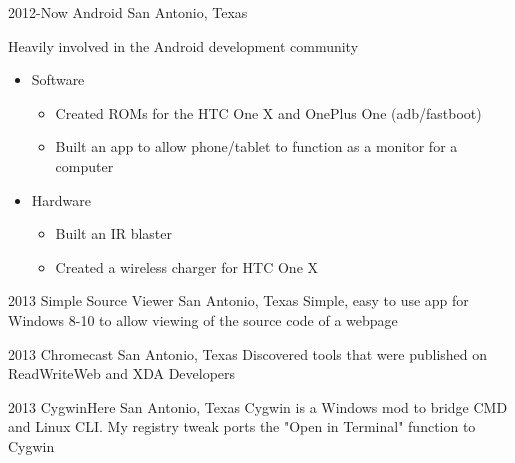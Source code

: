 \documentclass[print]{friggeri-cv} %
\begin{document}
\begin{entrylist}
	
	
	\entry
	{2012-Now}
	{Android}
	{San Antonio, Texas}
	{Heavily involved in the Android development community
		\begin{itemize}
			\item Software
				\begin{itemize}
					\item Created ROMs for the HTC One X and OnePlus One (adb/fastboot)
					\item Built an app to allow phone/tablet to function as a  monitor for a computer
				\end{itemize}
			\item Hardware
				\begin{itemize}
					\item Built an IR blaster
					\item Created a wireless charger for HTC One X
				\end{itemize}
		\end{itemize}
	}
	
	
	\entry
	{2013}
	{Simple Source Viewer}
	{San Antonio, Texas}
	{Simple, easy to use app for Windows 8-10 to allow viewing of the source code of a webpage}
	
	
	\entry
	{2013}
	{Chromecast}
	{San Antonio, Texas}
	{Discovered tools that were published on ReadWriteWeb and XDA Developers}
	
	
	\entry
	{2013}
	{CygwinHere}
	{San Antonio, Texas}
	{Cygwin is a Windows mod to bridge CMD and Linux CLI. My registry tweak ports the "Open in Terminal" function to Cygwin}
	
	
\end{entrylist}
\end{document}
